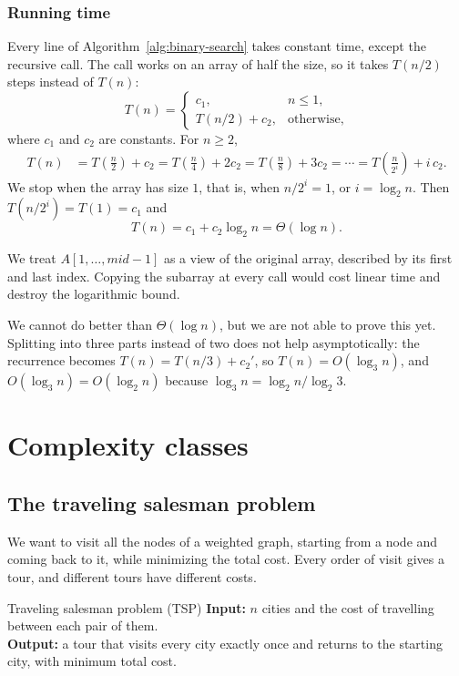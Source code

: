 \documentclass[a4paper,12pt,oneside]{report}
\begin{document}
\subsection{Running time}

Every line of Algorithm~\ref{alg:binary-search} takes constant time,
except the recursive call. The call works on an array of half the size,
so it takes $T(n/2)$ steps instead of $T(n)$:
\[
  T(n)=
  \begin{cases}
    c_1, & n\leq1,\\
    T(n/2)+c_2, & \text{otherwise},
  \end{cases}
\]
where $c_1$ and $c_2$ are constants. For $n\geq2$,
\begin{align*}
  T(n)&=T\!\left(\tfrac n2\right)+c_2
       =T\!\left(\tfrac n4\right)+2c_2
       =T\!\left(\tfrac n8\right)+3c_2
       =\cdots
       =T\!\left(\tfrac{n}{2^i}\right)+i\,c_2.
\end{align*}
We stop when the array has size $1$, that is, when $n/2^i=1$, or
$i=\log_2 n$. Then $T(n/2^i)=T(1)=c_1$ and
\[
  T(n)=c_1+c_2\log_2 n=\Theta(\log n).
\]

\begin{notebox}[Subarrays]
We treat $A[1,\ldots,\mathit{mid}-1]$ as a view of the original array,
described by its first and last index. Copying the subarray at every
call would cost linear time and destroy the logarithmic bound.
\end{notebox}

We cannot do better than $\Theta(\log n)$, but we are not able to prove
this yet. Splitting into three parts instead of two does not help
asymptotically: the recurrence becomes $T(n)=T(n/3)+c_2'$, so
$T(n)=O(\log_3 n)$, and $O(\log_3 n)=O(\log_2 n)$ because
$\log_3 n=\log_2 n/\log_2 3$.

\chapter{Complexity classes}

\section{The traveling salesman problem}

We want to visit all the nodes of a weighted graph, starting from a
node and coming back to it, while minimizing the total cost. Every
order of visit gives a tour, and different tours have different costs.

\begin{framedproblem}{Traveling salesman problem (TSP)}\label{prob:tsp}
\textbf{Input:} $n$ cities and the cost of travelling between each pair
of them.\\
\textbf{Output:} a tour that visits every city exactly once and returns
to the starting city, with minimum total cost.
\end{framedproblem}
\end{document}
